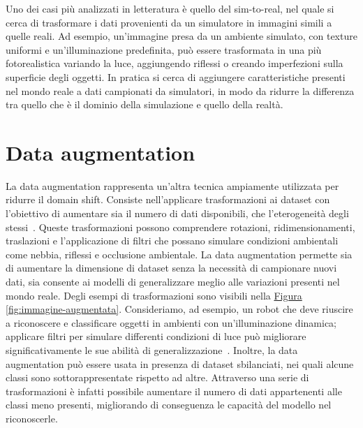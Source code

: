 \documentclass[12pt]{report}
\begin{document}
Uno dei casi più analizzati in letteratura è quello del sim-to-real, nel quale si cerca di trasformare i dati provenienti da un simulatore in immagini simili a quelle reali. Ad esempio, un'immagine presa da un ambiente simulato, con texture uniformi e un'illuminazione predefinita, può essere trasformata in una più fotorealistica variando la luce, aggiungendo riflessi o creando imperfezioni sulla superficie degli oggetti. In pratica si cerca di aggiungere caratteristiche presenti nel mondo reale a dati campionati da simulatori, in modo da ridurre la differenza tra quello che è il dominio della simulazione e quello della realtà.

\section{Data augmentation}
\label{sec:augmentation}

La data augmentation rappresenta un'altra tecnica ampiamente utilizzata per ridurre il domain shift. Consiste nell'applicare trasformazioni ai dataset con l'obiettivo di aumentare sia il numero di dati disponibili, che l'eterogeneità degli stessi~\cite{Shorten2019}. Queste trasformazioni possono comprendere rotazioni, ridimensionamenti, traslazioni e l'applicazione di filtri che possano simulare condizioni ambientali come nebbia, riflessi e occlusione ambientale. La data augmentation permette sia di aumentare la dimensione di dataset senza la necessità di campionare nuovi dati, sia consente ai modelli di generalizzare meglio alle variazioni presenti nel mondo reale. Degli esempi di trasformazioni sono visibili nella \hyperref[fig:immagine-augmentata]{Figura \ref{fig:immagine-augmentata}}. Consideriamo, ad esempio, un robot che deve riuscire a riconoscere e classificare oggetti in ambienti con un'illuminazione dinamica; applicare filtri per simulare differenti condizioni di luce può migliorare significativamente le sue abilità di generalizzazione~\cite{NEURIPS2021_fb4c4860}. Inoltre, la data augmentation può essere usata in presenza di dataset sbilanciati, nei quali alcune classi sono sottorappresentate rispetto ad altre. Attraverso una serie di trasformazioni è infatti possibile aumentare il numero di dati appartenenti alle classi meno presenti, migliorando di conseguenza le capacità del modello nel riconoscerle.
\end{document}

